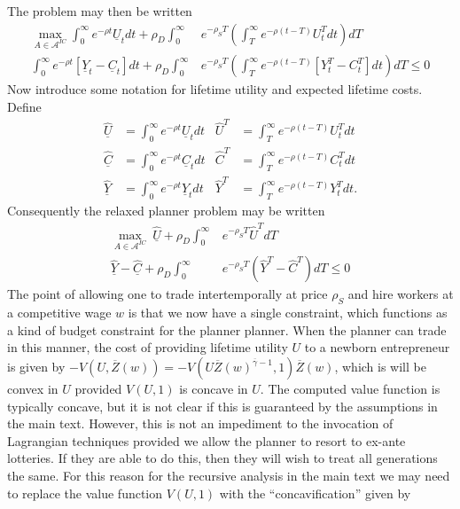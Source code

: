 \documentclass[11pt]{article}
\theoremstyle{plain}
\begin{document}
The problem may then be written 
\begin{align*}
\max_{A \in \mathcal{A}^{IC}} \int_0^{\infty} e^{-\rho t} \underline{U}_tdt + \rho_D\int_0^{\infty}& e^{-\rho_S T} {\left(\int_T^{\infty} e^{- \rho (t-T)}U^T_tdt\right)}dT
\\ \int_0^{\infty} e^{-\rho t} {\left[\underline{Y}_t - \underline{C}_t\right]} dt
 + \rho_D\int_0^{\infty} & e^{-\rho_S T} {\left(\int_T^{\infty} e^{- \rho (t-T)}[Y^T_t - C^T_t]dt\right)}dT \leq 0
\end{align*}
Now introduce some notation for lifetime utility and expected lifetime costs. Define 
\begin{align*}
\hat{\underline{U}} & =  \int_0^{\infty} e^{-\rho t} \underline{U}_tdt 
& \hat{U}^T & = \int_T^{\infty} e^{- \rho (t-T)}U^T_tdt
\\ \hat{\underline{C}} & =  \int_0^{\infty} e^{-\rho t} \underline{C}_tdt 
& \hat{C}^T & = \int_T^{\infty} e^{- \rho (t-T)}C^T_tdt
\\ \hat{\underline{Y}} & =  \int_0^{\infty} e^{-\rho t} \underline{Y}_tdt 
& \hat{Y}^T & = \int_T^{\infty} e^{- \rho (t-T)}Y^T_tdt.
\end{align*}
Consequently the relaxed planner problem may be written 
\begin{align*}
\max_{A \in \mathcal{A}^{IC}} \ \hat{\underline{U}} + \rho_D\int_0^{\infty}& e^{-\rho_S T} \hat{U}^TdT
\\ \hat{\underline{Y}} - \hat{\underline{C}} + \rho_D\int_0^{\infty} & e^{-\rho_S T} {\left(\hat{Y}^T - \hat{C}^T\right)}dT \leq 0
\end{align*}
The point of allowing one to trade intertemporally at price $\rho_S$ and hire workers at a competitive wage $w$ is that we now have a single constraint, which functions as a kind of budget constraint for the planner planner. When the planner can trade in this manner, the cost of providing lifetime utility $U$ to a newborn entrepreneur is given by $-V(U,\overline{Z}(w)) = -V(U\overline{Z}(w)^{\overline{\gamma}-1},1)\overline{Z}(w)$, which is will be convex in $U$ provided $V(U,1)$ is concave in $U$. The computed value function is typically concave, but it is not clear if this is guaranteed by the assumptions in the main text. However, this is not an impediment to the invocation of Lagrangian techniques provided we allow the planner to resort to ex-ante lotteries. If they are able to do this, then they will wish to treat all generations the same. For this reason for the recursive analysis in the main text we may need to replace the value function $V(U,1)$ with the ``concavification'' given by
\end{document}

